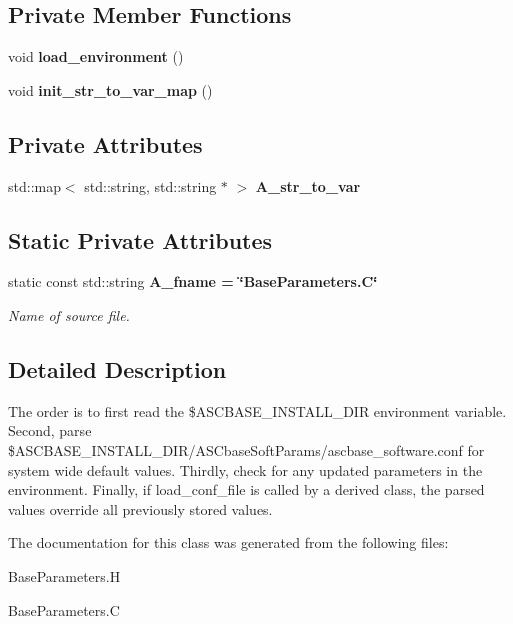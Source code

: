 \subsection*{Private Member Functions}
\begin{CompactItemize}
\item 
void \textbf{load\_\-environment} ()\label{classASCbase_1_1BaseParameters_d14f824ff3778e6eeadc6f280e712fa8}

\item 
void \textbf{init\_\-str\_\-to\_\-var\_\-map} ()\label{classASCbase_1_1BaseParameters_2b6efe90e6fc04c12a708793b134c337}

\end{CompactItemize}
\subsection*{Private Attributes}
\begin{CompactItemize}
\item 
std::map$<$ std::string, std::string $\ast$ $>$ \textbf{A\_\-str\_\-to\_\-var}\label{classASCbase_1_1BaseParameters_d2d6dce8fdb7bc506d95de45aa545b07}

\end{CompactItemize}
\subsection*{Static Private Attributes}
\begin{CompactItemize}
\item 
static const std::string \bf{A\_\-fname} = \char`\"{}Base\-Parameters.C\char`\"{}\label{classASCbase_1_1BaseParameters_41d22522d6af1b42c1ae142bba6190ca}

\begin{CompactList}\small\item\em Name of source file. \item\end{CompactList}\end{CompactItemize}


\subsection{Detailed Description}
The order is to first read the \$ASCBASE\_\-INSTALL\_\-DIR environment variable. Second, parse \$ASCBASE\_\-INSTALL\_\-DIR/ASCbase\-Soft\-Params/ascbase\_\-software.conf for system wide default values. Thirdly, check for any updated parameters in the environment. Finally, if load\_\-conf\_\-file is called by a derived class, the parsed values override all previously stored values. 



The documentation for this class was generated from the following files:\begin{CompactItemize}
\item 
Base\-Parameters.H\item 
Base\-Parameters.C\end{CompactItemize}
